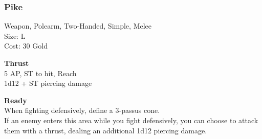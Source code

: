 \subsubsection{Pike}\label{weapon:pike}
Weapon, Polearm, Two-Handed, Simple, Melee\\
Size: L\\
Cost: 30 Gold

\textbf{Thrust}\\
5 AP, ST to hit,  Reach\\
1d12 + \texttimes ST piercing damage

\textbf{Ready}\\
When fighting defensively, define a 3-passus cone.\\
If an enemy enters this area while you fight defensively, you can choose to attack them with a thrust, dealing an additional 1d12 piercing damage.\\

